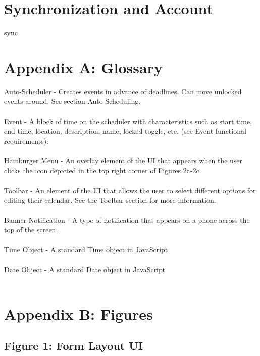 \documentclass{scrreprt}
\begin{document}
\chapter{Synchronization and Account}

sync

\chapter{Appendix A: Glossary}
Auto-Scheduler - Creates events in advance of deadlines. Can move unlocked events around. See section Auto Scheduling.\\
\\
Event - A block of time on the scheduler with characteristics such as start time, end time,
location, description, name, locked toggle, etc. (see Event functional requirements).\\
\\
Hamburger Menu - An overlay element of the UI that appears when the user clicks the icon depicted in the top right corner of Figures 2a-2c.\\
\\
Toolbar - An element of the UI that allows the user to select different options for editing their calendar.  See the Toolbar section for more information. \\
\\
Banner Notification - A type of notification that appears on a phone across the top of the screen. \\
\\
Time Object - A standard Time object in JavaScript \\
\\
Date Object - A standard Date object in JavaScript \\
\\
\chapter{Appendix B: Figures}

\section{Figure 1: Form Layout UI}
\end{document}
